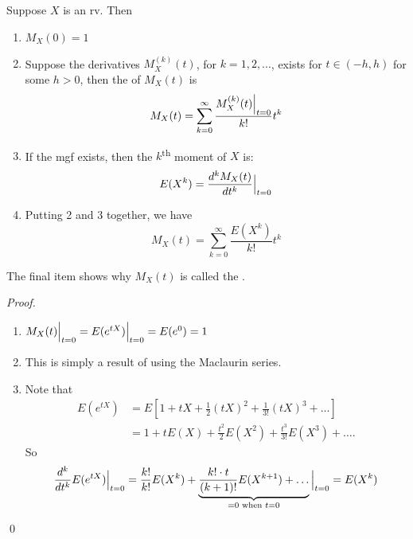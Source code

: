 \documentclass[notoc,notitlepage]{tufte-book}
\begin{document}
\begin{propo}
\label{propo:properties_of_the_mgf}
  Suppose $X$ is an rv. Then
  \begin{enumerate}
    \item $M_X(0) = 1$
    \item Suppose the derivatives $M_X^{(k)}(t)$, for $k = 1, 2, ...$, exists for $t \in (-h, h)$ for some $h > 0$, then the  of $M_X(t)$ is
      \begin{equation*}
        M_X(t) = \sum_{k = 0}^{\infty} \frac{M_X^{(k)} (t) \Big|_{t = 0}^{}}{k!} t^k
      \end{equation*}
    \item If the mgf exists, then the $k$\textsuperscript{th} moment of $X$ is:
      \begin{equation*}
        E(X^k) = \frac{d^k M_X(t)}{dt^k} \Big|_{t = 0}^{}
      \end{equation*}
    \item Putting 2 and 3 together, we have
      \begin{equation*}
        M_X(t) = \sum_{k = 0}^{\infty} \frac{E(X^k)}{k!} t^k
      \end{equation*}
  \end{enumerate}
  The final item shows why $M_X(t)$ is called the .
\end{propo}

\begin{proof}
  \begin{enumerate}
    \item $M_X(t) \Big|_{t = 0}^{} = E(e^{tX}) \Big|_{t = 0}^{} = E(e^{0}) = 1$
    \item This is simply a result of using the Maclaurin series.
    \item Note that
      \begin{align*}
        E(e^{tX})
          &= E \left[ 1 + tX + \frac{1}{2} (tX)^2 + \frac{1}{3!} (tX)^3 + \hdots \right] \\
          &= 1 + tE(X) + \frac{t^2}{2} E(X^2) + \frac{t^3}{3!} E(X^3) + \hdots.
      \end{align*}
      So
      \begin{equation*}
        \frac{d^k}{dt^k} E(e^{tX}) \Big|_{t = 0}^{}
          = \frac{k!}{k!} E(X^k) + \underbrace{ \frac{k! \cdot t}{(k + 1)!} E(X^{k + 1}) + \hdots }_{= 0 \text{ when } t = 0} \Big|_{t = 0}^{} = E(X^k)
      \end{equation*}
  \end{enumerate}\qed
\end{proof}
\end{document}
